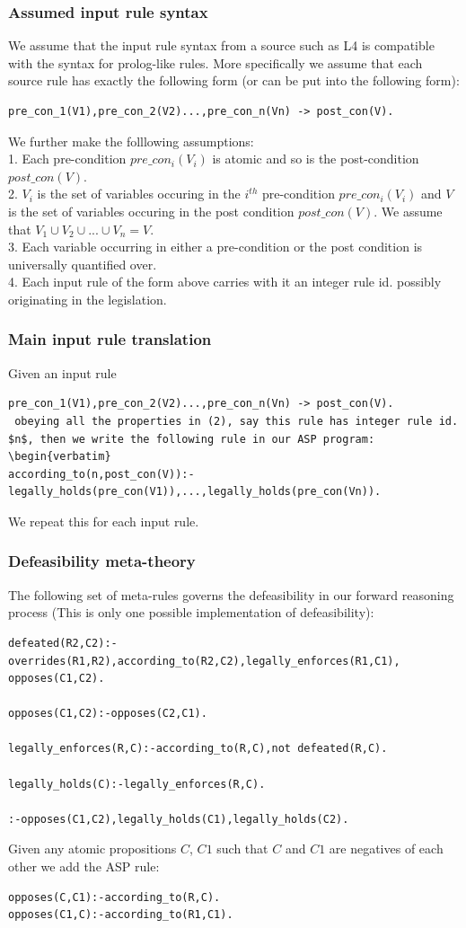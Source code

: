 \subsubsection{Assumed input rule syntax}
We assume that the input rule syntax from a source such as L4 is compatible with the syntax for prolog-like rules. More specifically we assume that each source rule has exactly the following form (or can be put into the following form):
\begin{verbatim}
pre_con_1(V1),pre_con_2(V2)...,pre_con_n(Vn) -> post_con(V).
\end{verbatim}
We further make the folllowing assumptions:\\
1. Each pre-condition $pre\_con_{i}(V_{i})$ is atomic and so is the post-condition $post\_con(V)$.\\
2. $V_{i}$ is the set of variables occuring in the $i^{th}$ pre-condition $pre\_con_{i}(V_{i})$ and $V$ is the set of variables occuring in the post condition $post\_con(V)$. We assume that $V_{1}\cup V_{2}\cup ... \cup V_{n} = V$.\\
3. Each variable occurring in either a pre-condition or the post condition is universally quantified over.\\
4. Each input rule of the form above carries with it an integer rule id. possibly originating in the legislation.
\subsubsection{Main input rule translation}
Given an input rule
\begin{verbatim}
pre_con_1(V1),pre_con_2(V2)...,pre_con_n(Vn) -> post_con(V).
 obeying all the properties in (2), say this rule has integer rule id. $n$, then we write the following rule in our ASP program: \begin{verbatim}
according_to(n,post_con(V)):-legally_holds(pre_con(V1)),...,legally_holds(pre_con(Vn)).    
\end{verbatim} 
We repeat this for each input rule.
\subsubsection{Defeasibility meta-theory}
The following set of meta-rules governs the defeasibility in our forward reasoning process (This is only one possible implementation of defeasibility):
\begin{verbatim}
defeated(R2,C2):-overrides(R1,R2),according_to(R2,C2),legally_enforces(R1,C1),
opposes(C1,C2).

opposes(C1,C2):-opposes(C2,C1).

legally_enforces(R,C):-according_to(R,C),not defeated(R,C).

legally_holds(C):-legally_enforces(R,C).

:-opposes(C1,C2),legally_holds(C1),legally_holds(C2). 
\end{verbatim}
Given any atomic propositions $C$, $C1$ such that $C$ and $C1$ are negatives of each other we add the ASP rule:
\begin{verbatim}
opposes(C,C1):-according_to(R,C).
opposes(C1,C):-according_to(R1,C1).
\end{verbatim}
